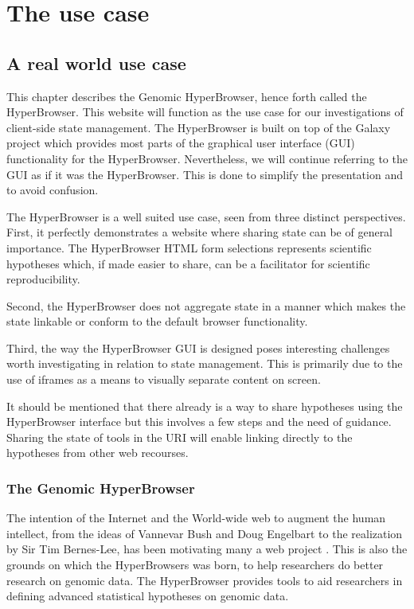 \documentclass[english]{ifimaster}
\begin{document}
\chapter{The use case}
\section{A real world use case}
This chapter describes the Genomic HyperBrowser, hence forth called the HyperBrowser. This website will function as the use case for our investigations of client-side state management. The HyperBrowser is built on top of the Galaxy project which provides most parts of the graphical user interface (GUI) functionality for the HyperBrowser. Nevertheless, we will continue referring to the GUI as if it was the HyperBrowser. This is done to simplify the presentation and to avoid confusion.

The HyperBrowser is a well suited use case, seen from three distinct perspectives. First, it perfectly demonstrates a website where sharing state can be of general importance. The HyperBrowser HTML form selections represents scientific hypotheses which, if made easier to share, can be a facilitator for scientific reproducibility. 

Second, the HyperBrowser does not aggregate state in a manner which makes the state linkable or conform to the default browser functionality.

Third, the way the HyperBrowser GUI is designed poses interesting challenges worth investigating in relation to state management. This is primarily due to the use of iframes as a means to visually separate content on screen.

It should be mentioned that there already is a way to share hypotheses using the HyperBrowser interface but this involves a few steps and the need of guidance. Sharing the state of tools in the URI will enable linking directly to the hypotheses from other web recourses.  

\subsection{The Genomic HyperBrowser}
The intention of the Internet and the World-wide web to augment the human intellect, from the ideas of Vannevar Bush and Doug Engelbart to the realization by Sir Tim Bernes-Lee, has been motivating many a web project \parencite{rheingold} \parencite{bernersLee}. This is also the grounds on which the HyperBrowsers was born, to help researchers do better research on genomic data. The HyperBrowser provides tools to aid researchers in defining advanced statistical hypotheses on genomic data.
\end{document}

